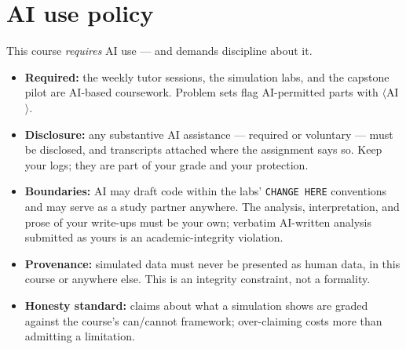 \documentclass[11pt]{article}
\begin{document}
\section*{AI use policy}
This course \emph{requires} AI use --- and demands discipline about it.
\begin{itemize}[nosep]
  \item \textbf{Required:} the weekly tutor sessions, the simulation
        labs, and the capstone pilot are AI-based coursework. Problem
        sets flag AI-permitted parts with $\langle$AI$\rangle$.
  \item \textbf{Disclosure:} any substantive AI assistance ---
        required or voluntary --- must be disclosed, and transcripts
        attached where the assignment says so. Keep your logs; they
        are part of your grade and your protection.
  \item \textbf{Boundaries:} AI may draft code within the labs'
        \texttt{CHANGE HERE} conventions and may serve as a study
        partner anywhere. The analysis, interpretation, and prose of
        your write-ups must be your own; verbatim AI-written analysis
        submitted as yours is an academic-integrity violation.
  \item \textbf{Provenance:} simulated data must never be presented as
        human data, in this course or anywhere else. This is an
        integrity constraint, not a formality.
  \item \textbf{Honesty standard:} claims about what a simulation
        shows are graded against the course's can/cannot framework;
        over-claiming costs more than admitting a limitation.
\end{itemize}
\end{document}
